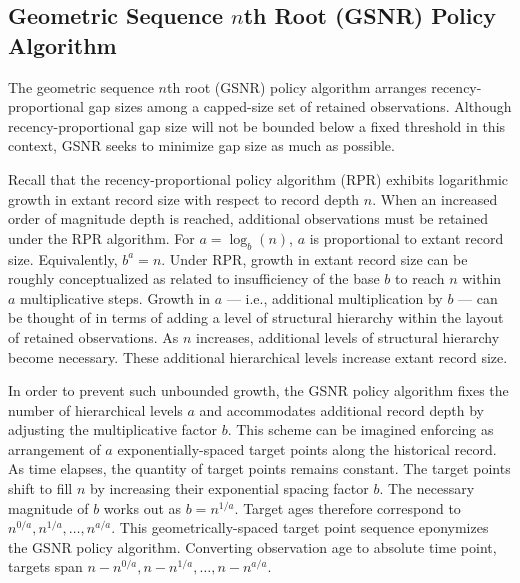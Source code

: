 \subsection{Geometric Sequence $n$th Root (GSNR) Policy Algorithm}
\label{sec:geom-seq-nth-root-algo}

The geometric sequence $n$th root (GSNR) policy algorithm arranges recency-proportional gap sizes among a capped-size set of retained observations.
Although recency-proportional gap size will not be bounded below a fixed threshold in this context, GSNR seeks to minimize gap size as much as possible.

Recall that the recency-proportional policy algorithm (RPR) exhibits logarithmic growth in extant record size with respect to record depth $n$.
When an increased order of magnitude depth is reached, additional observations must be retained under the RPR algorithm.
For $a = \log_b(n)$, $a$ is proportional to extant record size.
Equivalently, $b^a = n$.
Under RPR, growth in extant record size can be roughly conceptualized as related to insufficiency of the base $b$ to reach $n$ within $a$ multiplicative steps.
Growth in $a$ --- i.e., additional multiplication by $b$ --- can be thought of in terms of adding a level of structural hierarchy within the layout of retained observations.
As $n$ increases, additional levels of structural hierarchy become necessary.
These additional hierarchical levels increase extant record size.

In order to prevent such unbounded growth, the GSNR policy algorithm fixes the number of hierarchical levels $a$ and accommodates additional record depth by adjusting the multiplicative factor $b$.
This scheme can be imagined enforcing as arrangement of $a$ exponentially-spaced target points along the historical record.
As time elapses, the quantity of target points remains constant.
The target points shift to fill $n$ by increasing their exponential spacing factor $b$.
The necessary magnitude of $b$ works out as $b = n^{1/a}$.
Target ages therefore correspond to $n^{0/a}, n^{1/a}, \ldots, n^{a/a}$.
This geometrically-spaced target point sequence eponymizes the GSNR policy algorithm.
Converting observation age to absolute time point, targets span $n - n^{0/a}, n - n^{1/a}, \ldots, n - n^{a/a}$.


